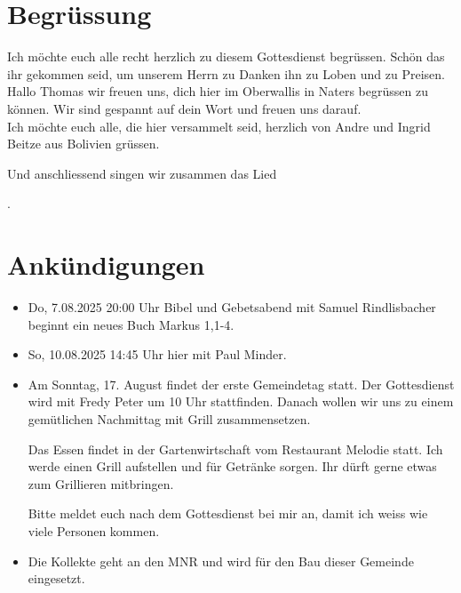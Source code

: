 \documentclass{../../inc/mybib}
\begin{document}
\section{Begrüssung}

Ich möchte euch alle recht herzlich zu diesem Gottesdienst begrüssen. Schön das ihr gekommen seid, um unserem Herrn zu Danken ihn zu Loben und zu Preisen.
Hallo Thomas wir freuen uns, dich hier im Oberwallis in Naters begrüssen zu können. Wir sind gespannt auf dein Wort und freuen uns darauf.\\
Ich möchte euch alle, die hier versammelt seid, herzlich von Andre und Ingrid Beitze aus Bolivien grüssen.

\beten{} Und anschliessend singen wir zusammen das Lied

{}.

\section{Ankündigungen}
\begin{itemize}
    \item {} Do, 7.08.2025 20:00 Uhr Bibel und Gebetsabend mit Samuel Rindlisbacher  beginnt ein neues Buch Markus 1,1-4.
    \item {} So, 10.08.2025 14:45 Uhr hier mit Paul Minder.
    \item {} Am Sonntag, 17. August findet der erste Gemeindetag statt. Der Gottesdienst wird mit Fredy Peter um 10 Uhr stattfinden. Danach wollen wir uns zu einem gemütlichen Nachmittag mit Grill zusammensetzen.
    
    Das Essen findet in der Gartenwirtschaft vom Restaurant Melodie statt. Ich werde einen Grill aufstellen und für Getränke sorgen. Ihr dürft gerne etwas zum Grillieren mitbringen.

    Bitte meldet euch nach dem Gottesdienst bei mir an, damit ich weiss wie viele Personen kommen.    
    \item {} Die Kollekte geht an den MNR und wird für den Bau dieser Gemeinde eingesetzt.
\end{itemize}
\end{document}
